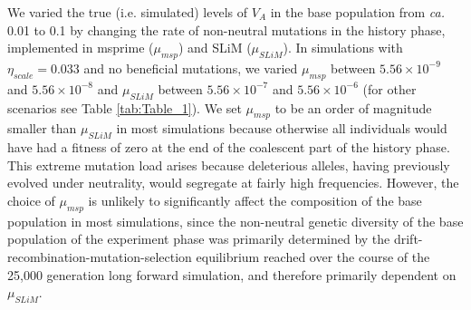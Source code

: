 \documentclass[12pt]{article}
\begin{document}
\begin{bibunit}
We varied the true (i.e. simulated) levels of $V_A$ in the base population from \textit{ca.} 0.01 to 0.1 by changing the rate of non-neutral mutations in the history phase, implemented in msprime ($\mu_{msp}$) and SLiM ($\mu_{SLiM}$). In simulations with $\eta_{scale} = 0.033$ and no beneficial mutations, we varied $\mu_{msp}$ between $5.56 \times 10^{-9}$ and $5.56 \times 10^{-8}$ and $\mu_{SLiM}$ between $5.56 \times 10^{-7}$ and $5.56 \times 10^{-6}$ (for other scenarios see Table \ref{tab:Table_1}). We set $\mu_{msp}$ to be an order of magnitude smaller than $\mu_{SLiM}$ in most simulations because otherwise all individuals would have had a fitness of zero at the end of the coalescent part of the history phase. This extreme mutation load arises because deleterious alleles, having previously evolved under neutrality, would segregate at fairly high frequencies. However, the choice of $\mu_{msp}$ is  unlikely to significantly affect the composition of the base population in most simulations, since the non-neutral genetic diversity of the base population of the experiment phase was primarily determined by the drift-recombination-mutation-selection equilibrium reached over the course of the 25,000 generation long forward simulation, and therefore primarily dependent on $\mu_{SLiM}$.





\end{bibunit}
\end{document}
